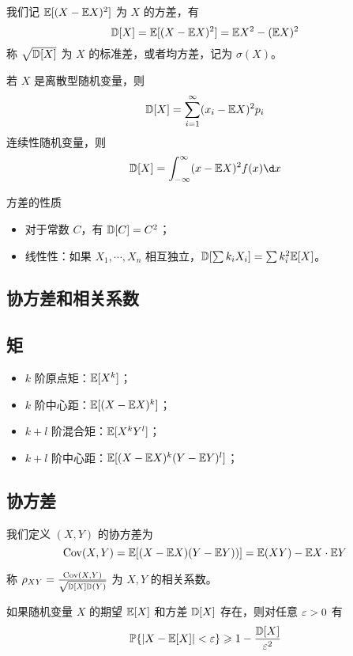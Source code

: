 我们记 $\mathbb{E}[(X - \mathbb{E} X)^2]$ 为 $X$ 的方差，有
\[ \mathbb{D} [X] = \mathbb{E}[(X - \mathbb{E} X)^2] = \mathbb{E} X^2 - (\mathbb{E} X)^2 \]
称 $\sqrt{\mathbb{D} [X]}$ 为 $X$ 的标准差，或者均方差，记为 $\sigma(X)$。

若 $X$ 是离散型随机变量，则
\[ \mathbb{D} [X] = \sum_{i=1}^{\infty} (x_i - \mathbb{E} X)^2 p_i \]
连续性随机变量，则
\[ \bbD [X] = \int_{-\infty}^{\infty} (x-\bbE X)^2 f(x) \d x \]

方差的性质
\begin{itemize}
	\item 对于常数 $C$，有 $\mathbb{D}[C] = C^2$；
	\item 线性性：如果 $X_1, \cdots, X_n$ 相互独立，$\mathbb{D}[\sum k_iX_i] = \sum k_i^2 \mathbb{E} [X]$。
\end{itemize}

\subsection{协方差和相关系数}

\subsection*{矩}
\begin{itemize}
	\item $k$ 阶原点矩：$\mathbb{E}[X^k]$；
	\item $k$ 阶中心距：$\mathbb{E}[(X - \mathbb{E} X)^k]$；
	\item $k + l$ 阶混合矩：$\mathbb{E}[X^k Y^l]$；
	\item $k + l$ 阶中心距：$\mathbb{E}[(X - \mathbb{E} X)^k (Y - \mathbb{E} Y)^l]$；
\end{itemize}

\subsection*{协方差}

\newcommand{\opCov}{\operatorname{Cov}}

我们定义 $(X, Y)$ 的协方差为
\[ \opCov(X, Y) = \bbE[(X - \bbE X)(Y - \bbE Y))] = \bbE(XY) - \bbE X \cdot \bbE Y \]

称 $\rho_{XY} = \frac{\opCov(X, Y)}{\sqrt{\bbD [X] \bbD(Y)}}$ 为 $X, Y$ 的相关系数。

\begin{theorem}[切比雪夫不等式]
	如果随机变量 $X$ 的期望 $\mathbb{E} [X]$ 和方差 $\mathbb{D} [X]$ 存在，则对任意 $\varepsilon > 0$ 有
	\[ \mathbb{P}\{|X - \mathbb{E} [X]| < \varepsilon\} \geqslant 1 - \frac{\mathbb{D} [X]}{\varepsilon^2} \]
\end{theorem}



